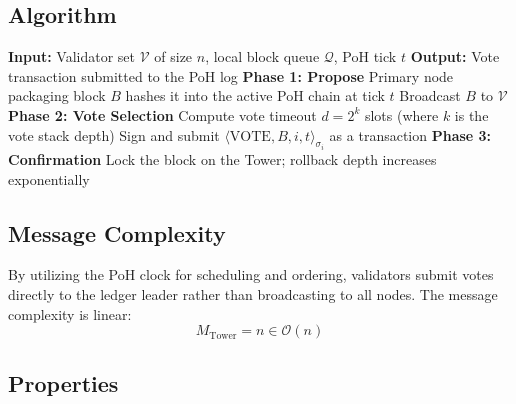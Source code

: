 \documentclass[12pt, oneside, a4paper]{report}
\theoremstyle{definition}
\theoremstyle{remark}
\begin{document}
\subsection{Algorithm}
\begin{algorithm}[H]
\caption{Tower BFT Consensus Vote}
\label{alg:tower}
\begin{algorithmic}[1]
\STATE \textbf{Input:} Validator set $\mathcal{V}$ of size $n$, local block queue $\mathcal{Q}$, PoH tick $t$
\STATE \textbf{Output:} Vote transaction submitted to the PoH log
\STATE \textbf{Phase 1: Propose}
\STATE Primary node packaging block $B$ hashes it into the active PoH chain at tick $t$
\STATE Broadcast $B$ to $\mathcal{V}$
\STATE \textbf{Phase 2: Vote Selection}
    \STATE Compute vote timeout $d = 2^k$ slots (where $k$ is the vote stack depth)
    \STATE Sign and submit $\langle\text{VOTE}, B, i, t\rangle_{\sigma_i}$ as a transaction
\ENDIF
\STATE \textbf{Phase 3: Confirmation}
    \STATE Lock the block on the Tower; rollback depth increases exponentially
\ENDIF
\end{algorithmic}
\end{algorithm}

\subsection{Message Complexity}
By utilizing the PoH clock for scheduling and ordering, validators submit votes directly to the ledger leader rather than broadcasting to all nodes. The message complexity is linear:
\begin{equation}
M_{\mathrm{Tower}} = n \in \mathcal{O}(n)
\end{equation}


\subsection{Properties}
\end{document}
